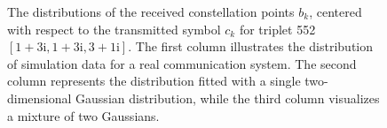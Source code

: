 \begin{figure}[hp]
\begin{minipage}[h]{0.33\linewidth}
{    }
    \end{minipage}
    \begin{minipage}[h]{0.33\linewidth}
    \end{minipage}
    \caption{The distributions of the received constellation points \( b_k \), centered with respect to the transmitted symbol \( c_k \) for triplet 552 $[1+3\mathrm{i}, 1+3\mathrm{i}, 3+1\mathrm{i}]$. The first column illustrates the distribution of simulation data for a real communication system. The second column represents the distribution fitted with a single two-dimensional Gaussian distribution, while the third column visualizes a mixture of two Gaussians.}
    \label{fig:gauss_triplet_552_compare_2d}
\end{figure}